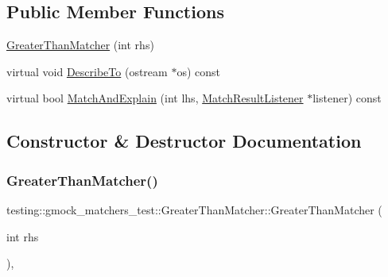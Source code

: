 \subsection*{Public Member Functions}
\begin{DoxyCompactItemize}
\item 
\hyperlink{classtesting_1_1gmock__matchers__test_1_1_greater_than_matcher_a605c50137599a1dba0701bbd735bf1e8}{Greater\+Than\+Matcher} (int rhs)
\item 
virtual void \hyperlink{classtesting_1_1gmock__matchers__test_1_1_greater_than_matcher_a49ea904382d0f5b80ccf622423ab0d94}{Describe\+To} (ostream $\ast$os) const
\item 
virtual bool \hyperlink{classtesting_1_1gmock__matchers__test_1_1_greater_than_matcher_a85a583852003638507d872238bcf7c0f}{Match\+And\+Explain} (int lhs, \hyperlink{classtesting_1_1_match_result_listener}{Match\+Result\+Listener} $\ast$listener) const
\end{DoxyCompactItemize}


\subsection{Constructor \& Destructor Documentation}
\mbox{\label{classtesting_1_1gmock__matchers__test_1_1_greater_than_matcher_a605c50137599a1dba0701bbd735bf1e8}} 
\subsubsection{\texorpdfstring{Greater\+Than\+Matcher()}{GreaterThanMatcher()}}
{\footnotesize\ttfamily testing\+::gmock\+\_\+matchers\+\_\+test\+::\+Greater\+Than\+Matcher\+::\+Greater\+Than\+Matcher (\begin{DoxyParamCaption}\item[{int}]{rhs }\end{DoxyParamCaption})\hspace{0.3cm}{\ttfamily [inline]}, {\ttfamily [explicit]}}



